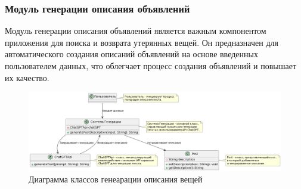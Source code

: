 \subsubsection{Модуль генерации описания объявлений}

Модуль генерации описания объявлений является важным компонентом приложения для поиска и возврата утерянных вещей. Он предназначен для автоматического создания описаний объявлений на основе введенных пользователем данных, что облегчает процесс создания объявлений и повышает их качество.

\begin{figure}[htb]
	\centering
	\includegraphics[width=.95\textwidth]{images/generating-diagram.png}
	\parskip=6pt
	\caption{Диаграмма классов генеарации описания вещей}
	\label{fig:generatingDiagram}
\end{figure}

